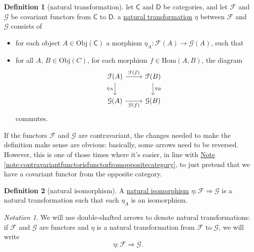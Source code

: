 \documentclass[a4paper]{report}
\newcommand{\defn}[1]{\ul{#1}}
\newcommand{\Obj}{\mathrm{Obj}}
\newcommand{\Hom}{\mathrm{Hom}}
\theoremstyle{definition}
\newtheorem{definition}{Definition}[section]
\theoremstyle{plain}
\theoremstyle{remark}
\newtheorem{notation}{Notation}[section]
\begin{document}
\begin{definition}[natural transformation]
  \label{def:naturaltransformation}
  let $\mathsf{C}$ and $\mathsf{D}$ be categories, and let $\mathcal{F}$ and $\mathcal{G}$ be covariant functors from $\mathsf{C}$ to $\mathsf{D}$. a \defn{natural transformation} $\eta$ between $\mathcal{F}$ and $\mathcal{G}$ consists of 
  \begin{itemize}
    \item for each object $A \in \Obj(\mathsf{C})$ a morphism $\eta_{A}\colon \mathcal{F}(A) \to \mathcal{G}(A)$, such that
    \item for all $A$, $B \in \Obj(C)$, for each morphism $f \in \Hom(A,B)$, the diagram
      \begin{equation*}
        \begin{tikzcd}
          \mathcal{F}(A)\arrow[d, swap, "\eta_{A}"] \arrow[r, "\mathcal{F}(f)"] & \mathcal{F}(B)\arrow[d, "\eta_{B}"] \\
          \mathcal{G}(A) \arrow[r, swap, "\mathcal{G}(f)"] & \mathcal{G}(B) 
        \end{tikzcd}
      \end{equation*}
      commutes.
  \end{itemize}

  If the functors $\mathcal{F}$ and $\mathcal{G}$ are contravariant, the changes needed to make the definition make sense are obvious: basically, some arrows need to be reversed. However, this is one of those times where it's easier, in line with \hyperref[note:contravariantfunctorisfunctorfromoppositecategory]{Note \ref*{note:contravariantfunctorisfunctorfromoppositecategory}}, to just pretend that we have a covariant functor from the opposite category.

\end{definition}

\begin{definition}[natural isomorphism]
  \label{def:naturalisomorphism}
  A \defn{natural isomorphism} $\eta\colon \mathcal{F} \Rightarrow \mathcal{G}$ is a natural transformation such that each $\eta_{A}$ is an isomorphism.
\end{definition}


\begin{notation}
  We will use double-shafted arrows to denote natural transformations: if $\mathcal{F}$ and $\mathcal{G}$ are functors and $\eta$ is a natural transformation from $\mathcal{F}$ to $\mathcal{G}$, we will write
  \begin{equation*}
    \eta\colon \mathcal{F} \Rightarrow \mathcal{G}.
  \end{equation*}
\end{notation}
\end{document}
